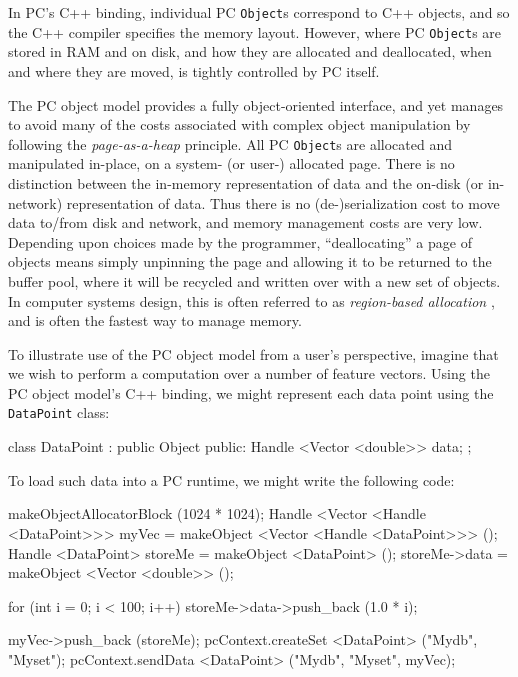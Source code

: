 In PC's C++ binding, individual PC \texttt{Object}s correspond to C++ objects, and so the C++ compiler specifies the memory layout.
However, where PC \texttt{Object}s are stored in RAM and on disk, and how they are allocated and deallocated, when and where they are moved, is
tightly controlled by PC itself.

The PC object model provides a fully object-oriented interface, and yet manages to avoid many of the costs associated with complex object manipulation
by following the \emph{page-as-a-heap} principle.  
All PC \texttt{Object}s are allocated and manipulated in-place, on a system-
(or user-) allocated page.  There is
no distinction between the in-memory representation of data and the on-disk (or in-network) representation of
data. Thus there is no (de-)serialization cost to move data to/from disk and network, and memory management costs are very low. Depending upon choices made by the
programmer, ``deallocating'' a page of objects
means simply unpinning the page and allowing it to be returned to the buffer
pool, where it will be recycled and written over with a new set of objects.  
In computer systems design, this is often referred to as
\emph{region-based allocation} \cite{tofte1997region,
  grossman2002region}, and is often the fastest way to manage
memory. 

To illustrate use of the PC object model from a user's perspective,
imagine that we wish to perform a computation over a number of feature vectors.  
Using the PC object model's C++ binding, we might represent each data point using the 
\texttt{DataPoint} class:

\begin{codesmall}
class DataPoint : public Object {
public:
	Handle <Vector <double>> data;
};
\end{codesmall}

\noindent
To load such data into a PC runtime, we might write the following code:

\begin{codesmall}
makeObjectAllocatorBlock (1024 * 1024);
Handle <Vector <Handle <DataPoint>>> myVec = 
     makeObject <Vector <Handle <DataPoint>>> ();
Handle <DataPoint> storeMe = makeObject <DataPoint> ();
storeMe->data = makeObject <Vector <double>> ();

for (int i = 0; i < 100; i++) 
     storeMe->data->push_back (1.0 * i);

myVec->push_back (storeMe);
pcContext.createSet <DataPoint> ("Mydb", "Myset");
pcContext.sendData <DataPoint> ("Mydb", "Myset", myVec);
\end{codesmall}

